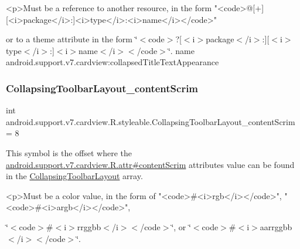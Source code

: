 \begin{DoxyVerb}      <p>Must be a reference to another resource, in the form "<code>@[+][<i>package</i>:]<i>type</i>:<i>name</i></code>"
\end{DoxyVerb}
 or to a theme attribute in the form \char`\"{}$<$code$>$?\mbox{[}$<$i$>$package$<$/i$>$\+:\mbox{]}\mbox{[}$<$i$>$type$<$/i$>$\+:\mbox{]}$<$i$>$name$<$/i$>$$<$/code$>$\char`\"{}.  name android.\+support.\+v7.\+cardview\+:collapsed\+Title\+Text\+Appearance \mbox{\label{classandroid_1_1support_1_1v7_1_1cardview_1_1R_1_1styleable_a4788b65165005d22b0fc4665a27806a3}} 
\subsubsection{\texorpdfstring{Collapsing\+Toolbar\+Layout\+\_\+content\+Scrim}{CollapsingToolbarLayout\_contentScrim}}
{\footnotesize\ttfamily int android.\+support.\+v7.\+cardview.\+R.\+styleable.\+Collapsing\+Toolbar\+Layout\+\_\+content\+Scrim = 8\hspace{0.3cm}{\ttfamily [static]}}

This symbol is the offset where the \hyperlink{classandroid_1_1support_1_1v7_1_1cardview_1_1R_1_1attr_a69812852b5af9dc223c86ed8704bbacc}{android.\+support.\+v7.\+cardview.\+R.\+attr\#content\+Scrim} attribute\textquotesingle{}s value can be found in the \hyperlink{classandroid_1_1support_1_1v7_1_1cardview_1_1R_1_1styleable_a3b4c5393d0c99cb4e5a7a3911fc606b4}{Collapsing\+Toolbar\+Layout} array.

\begin{DoxyVerb}      <p>Must be a color value, in the form of "<code>#<i>rgb</i></code>", "<code>#<i>argb</i></code>",
\end{DoxyVerb}
 \char`\"{}$<$code$>$\#$<$i$>$rrggbb$<$/i$>$$<$/code$>$\char`\"{}, or \char`\"{}$<$code$>$\#$<$i$>$aarrggbb$<$/i$>$$<$/code$>$\char`\"{}. 

